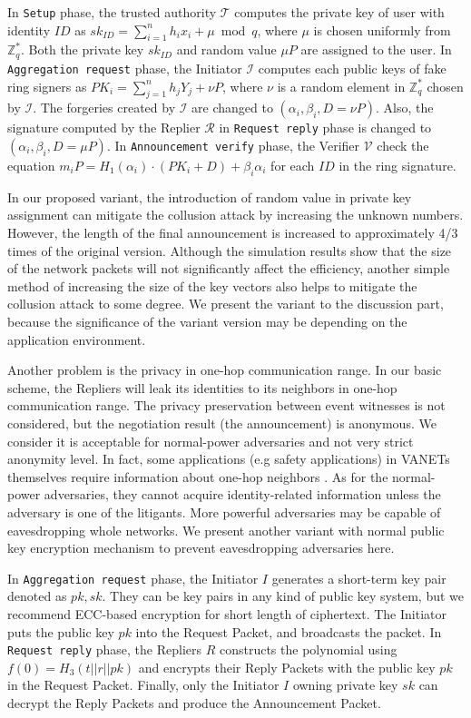\documentclass[a4paper]{article}
\begin{document}
In \texttt{Setup} phase, the trusted authority $\mathcal{T}$ computes the private key of user with identity $ID$ as $sk_{ID} = \sum_{i=1}^n h_ix_i + \mu \bmod q$, where $\mu$ is chosen uniformly from $\mathbb{Z}_{q}^{*}$. Both the private key $sk_{ID}$ and random value $\mu P$ are assigned to the user. In \texttt{Aggregation request} phase, the Initiator $\mathcal{I}$ computes each public keys of fake ring signers as $PK_i = \sum_{j=1}^n {h_j}{Y_j} + \nu P$, where $\nu$ is a random element in $\mathbb{Z}_{q}^{*}$ chosen by $\mathcal{I}$. The forgeries created by $\mathcal{I}$ are changed to $(\alpha_i, \beta_i, D = \nu P)$. Also, the signature computed by the Replier $\mathcal{R}$ in \texttt{Request reply} phase is changed to $(\alpha_i, \beta_i, D = \mu P)$. In \texttt{Announcement verify} phase, the Verifier $\mathcal{V}$ check the equation $m_i P = H_1(\alpha_i) \cdot (PK_i+D) + \beta_i \alpha_i$ for each $ID$ in the ring signature.

In our proposed variant, the introduction of random value in private key assignment can mitigate the collusion attack by increasing the unknown numbers. However, the length of the final announcement is increased to approximately 4/3 times of the original version. Although the simulation results show that the size of the network packets will not significantly affect the efficiency, another simple method of increasing the size of the key vectors also helps to mitigate the collusion attack to some degree. We present the variant to the discussion part, because the significance of the variant version may be depending on the application environment.

Another problem is the privacy in one-hop communication range. In our basic scheme, the Repliers will leak its identities to its neighbors in one-hop communication range. The privacy preservation between event witnesses is not considered, but the negotiation result (the announcement) is anonymous. We consider it is acceptable for normal-power adversaries and not very strict anonymity level. In fact, some applications (e.g safety applications) in VANETs themselves require information about one-hop neighbors \cite{AS13}. As for the normal-power adversaries, they cannot acquire identity-related information unless the adversary is one of the litigants. More powerful adversaries may be capable of eavesdropping whole networks. We present another variant with normal public key encryption mechanism to prevent eavesdropping adversaries here.

In \texttt{Aggregation request} phase, the Initiator $I$ generates a short-term key pair denoted as $pk, sk$. They can be key pairs in any kind of public key system, but we recommend ECC-based encryption for short length of ciphertext. The Initiator puts the public key $pk$ into the Request Packet, and broadcasts the packet. In \texttt{Request reply} phase, the Repliers $R$ constructs the polynomial using $f(0) = H_3(t||r||pk)$ and encrypts their Reply Packets with the public key $pk$ in the Request Packet. Finally, only the Initiator $I$ owning private key $sk$ can decrypt the Reply Packets and produce the Announcement Packet.
\end{document}
